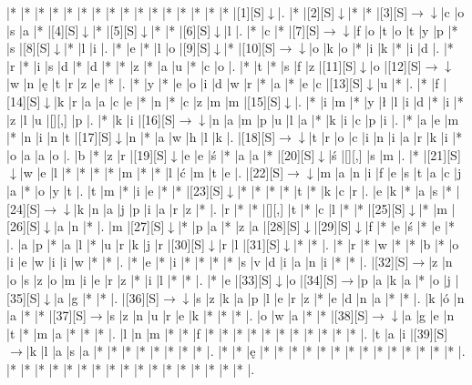 \documentclass[11pt]{article}
\newcommand\drarr{$\rightarrow \!\!\!\!\! \downarrow$}
\newcommand\rarr{$\rightarrow$}
\newcommand\darr{$\downarrow$}
\begin{document}
\noindent\begin{Puzzle}{16}{30}|*	|*	|*	|*	|*	|*	|*	|*	|*	|*	|*	|*	|*	|*	|*	|*	|[1][S]\darr	|.
|*	|[2][S]\darr	|*	|*	|[3][S]\drarr	|c	|o	|s	|a	|*	|[4][S]\darr	|*	|[5][S]\darr	|*	|*	|[6][S]\darr	|l	|.
|*	|c	|*	|[7][S]\drarr	|f	|o	|t	|o	|t	|y	|p	|*	|s	|[8][S]\darr	|*	|l	|i	|.
|*	|e	|*	|l	|o	|[9][S]\darr	|*	|[10][S]\drarr	|o	|k	|o	|*	|i	|k	|*	|i	|d	|.
|*	|r	|*	|i	|s	|d	|*	|d	|*	|*	|z	|*	|a	|u	|*	|c	|o	|.
|*	|t	|*	|s	|f	|z	|[11][S]\darr	|o	|[12][S]\drarr	|w	|n	|ę	|t	|r	|z	|e	|*	|.
|*	|y	|*	|e	|o	|i	|d	|w	|r	|*	|a	|*	|e	|c	|[13][S]\darr	|u	|*	|.
|*	|f	|[14][S]\darr	|k	|r	|a	|a	|c	|e	|*	|n	|*	|c	|z	|m	|m	|[15][S]\darr	|.
|*	|i	|m	|*	|y	|ł	|l	|i	|d	|*	|i	|*	|z	|l	|u	|[][,]{ }	|p	|.
|*	|k	|i	|[16][S]\drarr	|n	|a	|m	|p	|u	|l	|a	|*	|k	|i	|c	|p	|i	|.
|*	|a	|e	|m	|*	|n	|i	|n	|t	|[17][S]\darr	|n	|*	|a	|w	|h	|l	|k	|.
|[18][S]\drarr	|t	|r	|o	|c	|i	|n	|i	|a	|r	|k	|i	|*	|o	|a	|a	|o	|.
|b	|*	|z	|r	|[19][S]\darr	|e	|e	|ś	|*	|a	|a	|*	|[20][S]\darr	|ś	|[][,]{ }	|s	|m	|.
|*	|[21][S]\darr	|w	|e	|l	|*	|*	|*	|*	|m	|*	|*	|l	|ć	|m	|t	|e	|.
|[22][S]\drarr	|m	|a	|n	|i	|f	|e	|s	|t	|a	|c	|j	|a	|*	|o	|y	|t	|.
|t	|m	|*	|i	|e	|*	|*	|[23][S]\darr	|*	|*	|*	|*	|t	|*	|k	|c	|r	|.
|e	|k	|*	|a	|s	|*	|[24][S]\drarr	|k	|n	|a	|j	|p	|i	|a	|r	|z	|*	|.
|r	|*	|*	|[][,]{ }	|t	|*	|c	|l	|*	|*	|[25][S]\darr	|*	|m	|[26][S]\darr	|a	|n	|*	|.
|m	|[27][S]\darr	|*	|p	|a	|*	|z	|a	|[28][S]\darr	|[29][S]\darr	|f	|*	|e	|ś	|*	|e	|*	|.
|a	|p	|*	|a	|l	|*	|u	|r	|k	|j	|r	|[30][S]\darr	|r	|l	|[31][S]\darr	|*	|*	|.
|*	|r	|*	|w	|*	|*	|b	|*	|o	|i	|e	|w	|i	|i	|w	|*	|*	|.
|*	|e	|*	|i	|*	|*	|*	|*	|s	|v	|d	|i	|a	|n	|i	|*	|*	|.
|[32][S]\rarr	|z	|n	|o	|s	|z	|o	|m	|i	|e	|r	|z	|*	|i	|l	|*	|*	|.
|*	|e	|[33][S]\darr	|o	|[34][S]\rarr	|p	|a	|k	|a	|*	|o	|j	|[35][S]\darr	|a	|g	|*	|*	|.
|[36][S]\drarr	|s	|z	|k	|a	|p	|l	|e	|r	|z	|*	|e	|d	|n	|a	|*	|*	|.
|k	|ó	|n	|a	|*	|*	|[37][S]\rarr	|s	|z	|n	|u	|r	|e	|k	|*	|*	|*	|.
|o	|w	|a	|*	|*	|[38][S]\drarr	|a	|g	|e	|n	|t	|*	|m	|a	|*	|*	|*	|.
|l	|n	|m	|*	|*	|f	|*	|*	|*	|*	|*	|*	|*	|*	|*	|*	|*	|.
|t	|a	|i	|[39][S]\rarr	|k	|l	|a	|s	|a	|*	|*	|*	|*	|*	|*	|*	|*	|.
|*	|*	|ę	|*	|*	|*	|*	|*	|*	|*	|*	|*	|*	|*	|*	|*	|*	|.
|*	|*	|*	|*	|*	|*	|*	|*	|*	|*	|*	|*	|*	|*	|*	|*	|*	|.\end{Puzzle}

\newpage
\end{document}
